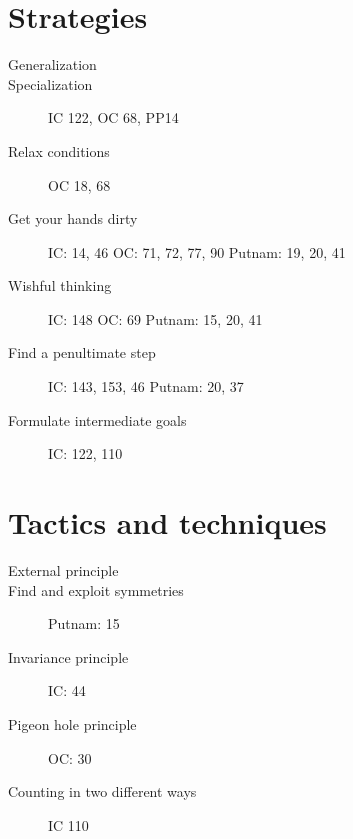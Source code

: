 \documentclass[11pt]{article}
\begin{document}
\newpage
\section{Strategies}
\begin{description}
    \item[Generalization]
    \item[Specialization] IC 122, OC 68, PP14
    \item[Relax conditions] OC 18, 68
    \item[Get your hands dirty] IC: 14, 46 OC: 71, 72, 77, 90 Putnam: 19, 20, 41
    \item[Wishful thinking] IC: 148 OC: 69 Putnam: 15, 20, 41 
    \item[Find a penultimate step] IC: 143, 153, 46 Putnam: 20, 37
    \item[Formulate intermediate goals] IC: 122, 110     
\end{description}

\section{Tactics and techniques}
\begin{description}
    \item[External principle]
    \item[Find and exploit symmetries] Putnam: 15
    \item[Invariance principle] IC: 44
    \item[Pigeon hole principle] OC: 30
    \item[Counting in two different ways] IC 110
\end{description}
\end{document}
